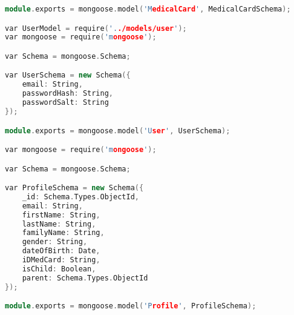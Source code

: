 \begin{lstlisting}[language=C++, style=cplusplusstyle]
module.exports = mongoose.model('MedicalCard', MedicalCardSchema);

var UserModel = require('../models/user');
var mongoose = require('mongoose');

var Schema = mongoose.Schema;

var UserSchema = new Schema({
    email: String,
    passwordHash: String,
    passwordSalt: String
});

module.exports = mongoose.model('User', UserSchema);

var mongoose = require('mongoose');

var Schema = mongoose.Schema;

var ProfileSchema = new Schema({
    _id: Schema.Types.ObjectId,
    email: String,
    firstName: String,
    lastName: String,
    familyName: String,
    gender: String,
    dateOfBirth: Date,
    iDMedCard: String,
    isChild: Boolean,
    parent: Schema.Types.ObjectId
});

module.exports = mongoose.model('Profile', ProfileSchema);



\end{lstlisting}
